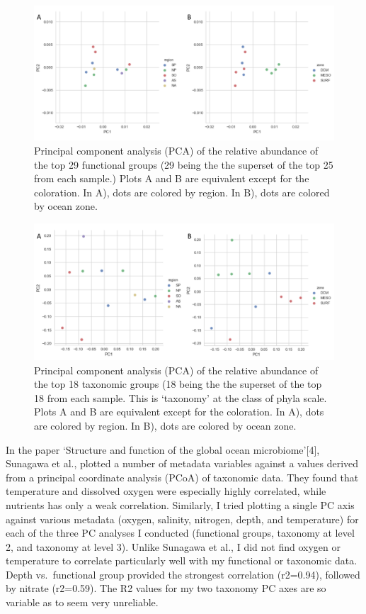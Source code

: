 \documentclass[12pt,a4paper,]{article}
\begin{document}
\begin{figure}
\centering
\includegraphics{imgs/go_pca.png}
\caption{Principal component analysis (PCA) of the relative abundance of
the top 29 functional groups (29 being the the superset of the top 25
from each sample.) Plots A and B are equivalent except for the
coloration. In A), dots are colored by region. In B), dots are colored
by ocean zone.\label{fig:go_pca}}
\end{figure}

\begin{figure}
\centering
\includegraphics{imgs/tax_pca.png}
\caption{Principal component analysis (PCA) of the relative abundance of
the top 18 taxonomic groups (18 being the the superset of the top 18
from each sample. This is `taxonomy' at the class of phyla scale. Plots
A and B are equivalent except for the coloration. In A), dots are
colored by region. In B), dots are colored by ocean
zone.\label{fig:tax_pca}}
\end{figure}

In the paper `Structure and function of the global ocean
microbiome'{[}4{]}, Sunagawa et al., plotted a number of metadata
variables against a values derived from a principal coordinate analysis
(PCoA) of taxonomic data. They found that temperature and dissolved
oxygen were especially highly correlated, while nutrients has only a
weak correlation. Similarly, I tried plotting a single PC axis against
various metadata (oxygen, salinity, nitrogen, depth, and temperature)
for each of the three PC analyses I conducted (functional groups,
taxonomy at level 2, and taxonomy at level 3). Unlike Sunagawa et al., I
did not find oxygen or temperature to correlate particularly well with
my functional or taxonomic data. Depth vs.~functional group provided the
strongest correlation (r2=0.94), followed by nitrate (r2=0.59). The R2
values for my two taxonomy PC axes are so variable as to seem very
unreliable.
\end{document}
